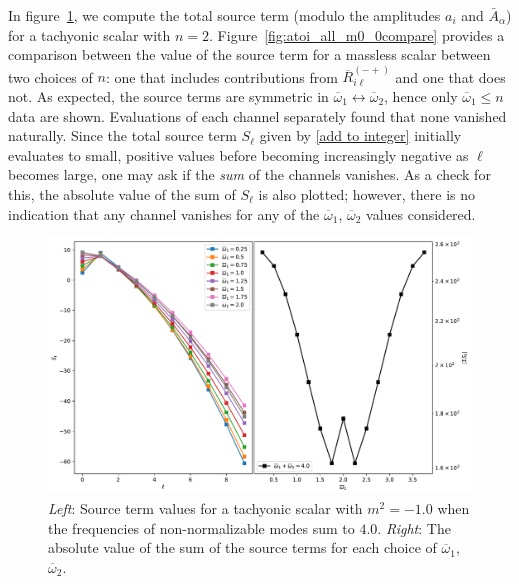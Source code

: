\documentclass[letterpaper,11pt]{article}
\newcommand{\oone}{\overline{\omega}_1}
\newcommand{\otwo}{\overline{\omega}_2}
\begin{document}
In figure~\ref{fig:atoi_all_m-4_0}, we compute the total source term (modulo the amplitudes $a_i$ and $\bar A_\alpha$) for a tachyonic scalar with $n = 2$. Figure~\ref{fig:atoi_all_m0_0compare} provides a comparison between the value of the source term for a massless scalar between two choices of $n$: one that includes contributions from $\overline{R}_{i\ell}^{(-+)}$ and one that does not. As expected, the source terms are symmetric in $\oone \leftrightarrow \otwo$, hence only $\oone \leq n$ data are shown. Evaluations of each channel separately found that none vanished naturally. Since the total source term $S_\ell$ given by \eqref{add to integer} initially evaluates to small, positive values before becoming increasingly negative as $\ell$ becomes large, one may ask if the \emph{sum} of the channels vanishes. As a check for this, the absolute value of the sum of $S_\ell$ is also plotted; however, there is no indication that any channel vanishes for any of the $\oone$, $\otwo$ values considered. 

\begin{figure}
\centering
\includegraphics[width=\textwidth]{./figures/NNAddToInteger_source_n2_m-1_0}
\caption{{\it Left}: Source term values for a tachyonic scalar with $m^2 = -1.0$ when the frequencies of non-normalizable modes sum to $4.0$. {\it Right}: The absolute value of the sum of the source terms for each choice of $\oone$, $\otwo$.}
\label{fig:atoi_all_m-4_0}
\end{figure}
\end{document}
